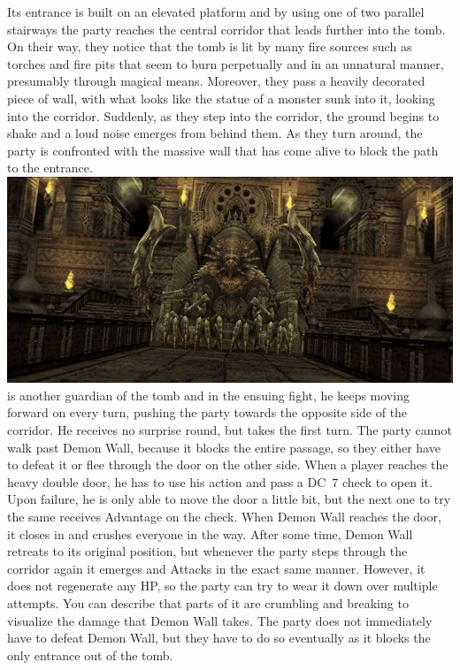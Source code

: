 Its entrance is built on an elevated platform and by using one of two parallel stairways the party reaches the central corridor that leads further into the tomb.
On their way, they notice that the tomb is lit by many fire sources such as torches and fire pits that seem to burn perpetually and in an unnatural manner, presumably through magical means.
Moreover, they pass a heavily decorated piece of wall, with what looks like the statue of a monster sunk into it, looking into the corridor.
Suddenly, as they step into the corridor, the ground begins to shake and a loud noise emerges from behind them.
As they turn around, the party is confronted with the massive wall that has come alive to block the path to the entrance.
%
\vfill
%
\includegraphics[width=\columnwidth]{./art/tombofraithwall/demonwall2.jpg}
%
\newpage
%
 is another guardian of the tomb and in the ensuing fight, he keeps moving forward on every turn, pushing the party towards the opposite side of the corridor.
He receives no surprise round, but takes the first turn.
The party cannot walk past Demon Wall, because it blocks the entire passage, so they either have to defeat it or flee through the door on the other side.
When a player reaches the heavy double door, he has to use his action and pass a DC~7 check to open it.
Upon failure, he is only able to move the door a little bit, but the next one to try the same receives Advantage on the check.
When Demon Wall reaches the door, it closes in and crushes everyone in the way. 
After some time, Demon Wall retreats to its original position, but whenever the party steps through the corridor again it emerges and Attacks in the exact same manner.
However, it does not regenerate any HP, so the party can try to wear it down over multiple attempts.
You can describe that parts of it are crumbling and breaking to visualize the damage that Demon Wall takes.
The party does not immediately have to defeat Demon Wall, but they have to do so eventually as it blocks the only entrance out of the tomb.
